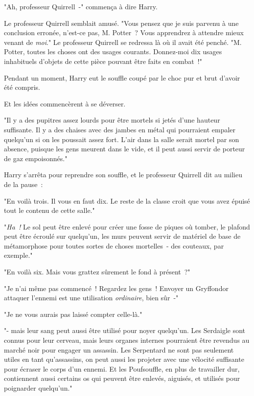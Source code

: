 "Ah, professeur Quirrell~-" commença à dire Harry.

Le professeur Quirrell semblait amusé. "Vous pensez que je suis parvenu à une conclusion erronée, n'est-ce pas, M. Potter~? Vous apprendrez à attendre mieux venant de \emph{moi}." Le professeur Quirrell se redressa là où il avait été penché. "M. Potter, toutes les choses ont des usages courants. Donnez-moi dix usages inhabituels d'objets de cette pièce pouvant être faits en combat~!"

Pendant un moment, Harry eut le souffle coupé par le choc pur et brut d'avoir été compris.

Et les idées commencèrent à se déverser.

"Il y a des pupitres assez lourds pour être mortels si jetés d'une hauteur suffisante. Il y a des chaises avec des jambes en métal qui pourraient empaler quelqu'un si on les poussait assez fort. L'air dans la salle serait mortel par son absence, puisque les gens meurent dans le vide, et il peut aussi servir de porteur de gaz empoisonnés."

Harry s'arrêta pour reprendre son souffle, et le professeur Quirrell dit au milieu de la pause~:

"En voilà trois. Il vous en faut dix. Le reste de la classe croit que vous avez épuisé tout le contenu de cette salle."

"\emph{Ha~!} Le sol peut être enlevé pour créer une fosse de piques où tomber, le plafond peut être écroulé sur quelqu'un, les murs peuvent servir de matériel de base de métamorphose pour toutes sortes de choses mortelles~- des couteaux, par exemple."

"En voilà six. Mais vous grattez sûrement le fond à présent~?"

"Je n'ai même pas commencé~! Regardez les gens~! Envoyer un Gryffondor attaquer l'ennemi est une utilisation \emph{ordinaire}, bien sûr~-"

"Je ne vous aurais pas laissé compter celle-là."

"- mais leur sang peut aussi être utilisé pour noyer quelqu'un. Les Serdaigle sont connus pour leur cerveau, mais leurs organes internes pourraient être revendus au marché noir pour engager un assassin. Les Serpentard ne sont pas seulement utiles en tant qu'assassins, on peut aussi les projeter avec une vélocité suffisante pour écraser le corps d'un ennemi. Et les Poufsouffle, en plus de travailler dur, contiennent aussi certains os qui peuvent être enlevés, aiguisés, et utilisés pour poignarder quelqu'un."

